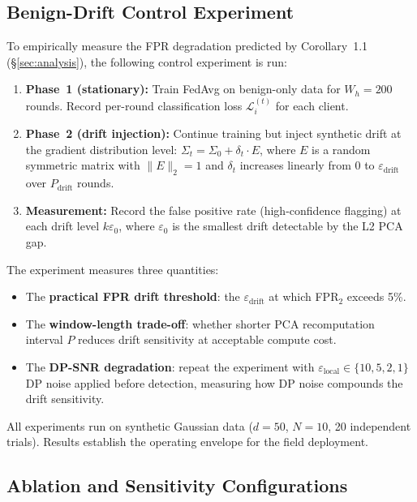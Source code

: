 \documentclass[10pt,journal]{IEEEtran}
\begin{document}
\subsection{Benign-Drift Control Experiment}
\label{sec:exp-drift}

To empirically measure the FPR degradation predicted by Corollary~1.1 (\S\ref{sec:analysis}), the following control experiment is run:

\begin{enumerate}
  \item \textbf{Phase~1 (stationary):} Train FedAvg on benign-only data for $W_h = 200$ rounds. Record per-round classification loss $\mathcal{L}_i^{(t)}$ for each client.
  \item \textbf{Phase~2 (drift injection):} Continue training but inject synthetic drift at the gradient distribution level: $\Sigma_t = \Sigma_0 + \delta_t \cdot E$, where $E$ is a random symmetric matrix with $\|E\|_2 = 1$ and $\delta_t$ increases linearly from $0$ to $\varepsilon_{\text{drift}}$ over $P_{\text{drift}}$ rounds.
  \item \textbf{Measurement:} Record the false positive rate (high-confidence flagging) at each drift level $k\varepsilon_0$, where $\varepsilon_0$ is the smallest drift detectable by the L2 PCA gap.
\end{enumerate}

The experiment measures three quantities:
\begin{itemize}
  \item The \textbf{practical FPR drift threshold}: the $\varepsilon_{\text{drift}}$ at which FPR$_2$ exceeds 5\%.
  \item The \textbf{window-length trade-off}: whether shorter PCA recomputation interval $P$ reduces drift sensitivity at acceptable compute cost.
  \item The \textbf{DP-SNR degradation}: repeat the experiment with $\varepsilon_{\text{local}} \in \{10, 5, 2, 1\}$ DP noise applied before detection, measuring how DP noise compounds the drift sensitivity.
\end{itemize}

All experiments run on synthetic Gaussian data ($d=50$, $N=10$, 20 independent trials). Results establish the operating envelope for the field deployment.

\subsection{Ablation and Sensitivity Configurations}\label{sec:ablation}
\end{document}
